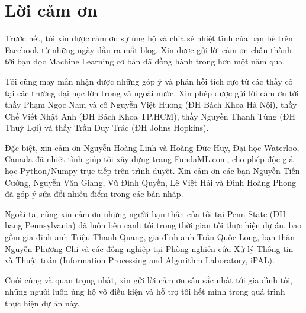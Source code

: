 



\section{Lời cảm ơn}
Trước hết, tôi xin được cảm ơn sự ủng hộ và chia sẻ nhiệt tình của bạn bè trên  Facebook từ những ngày đầu ra mắt blog. Xin được gửi lời cảm ơn chân thành tới bạn đọc Machine Learning cơ bản đã đồng hành trong hơn một năm qua.

Tôi cũng may mắn nhận được những góp ý và phản hồi tích cực từ các thầy cô
tại các trường đại học lớn trong và ngoài nước. Xin phép được gửi lời cảm ơn
tới thầy Phạm Ngọc Nam và cô Nguyễn Việt Hương (ĐH Bách Khoa Hà Nội), thầy Chế
Viết Nhật Anh (ĐH Bách Khoa TP.HCM), thầy Nguyễn Thanh Tùng (ĐH Thuỷ Lợi)
và thầy Trần Duy Trác (ĐH Johns Hopkins).

Đặc biệt, xin cảm ơn Nguyễn Hoàng Linh và Hoàng Đức Huy, Đại học Waterloo,
Canada đã nhiệt tình giúp tôi xây dựng trang \url{FundaML.com}, cho phép độc giả
học Python/Numpy trực tiếp trên trình duyệt. Xin cảm ơn các bạn Nguyễn
Tiến Cường, Nguyễn Văn Giang, Vũ Đình Quyền, Lê Việt Hải và Đinh Hoàng Phong đã
góp ý sửa đổi nhiều điểm trong các bản nháp.

Ngoài ta, cũng xin cảm ơn những người bạn thân của tôi tại Penn State
(ĐH bang Pennsylvania) đã luôn bên cạnh tôi trong thời gian tôi thực hiện dự án,
bao gồm gia đình anh Triệu Thanh Quang, gia đình anh Trần Quốc Long, bạn thân
Nguyễn Phương Chi và các đồng nghiệp tại Phòng nghiên cứu Xử lý Thông tin và
Thuật toán (Information Processing and Algorithm Laboratory, iPAL).

Cuối cùng và quan trọng nhất, xin gửi lời cảm ơn sâu sắc nhất tới gia đình tôi,
những người luôn ủng hộ vô điều kiện và hỗ trợ tôi hết mình trong quá trình thực
hiện dự án này.





